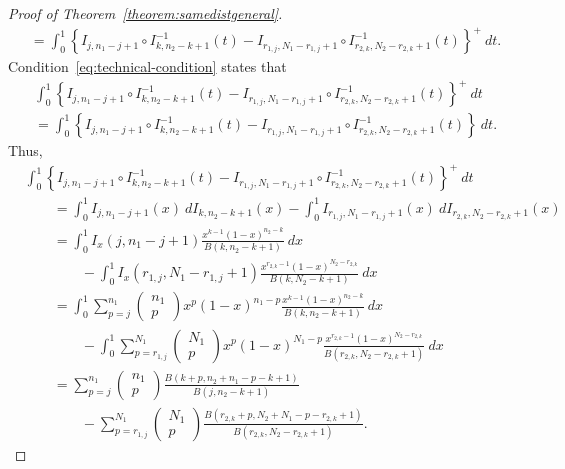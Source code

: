 \documentclass[12pt]{article}
\begin{document}
\begin{proof}[Proof of Theorem~\ref{theorem:samedistgeneral}]
\begin{align*}
	&= \int_0^1 \left\{I_{j, n_1-j+1} \circ I_{k, n_2-k+1}^{-1}(t) - I_{ r_{1,j}, N_1- r_{1,j}+1} \circ I_{ r_{2,k}, N_2- r_{2,k}+1}^{-1}(t)\right\}^+	 \ dt.
\end{align*}
Condition~\eqref{eq:technical-condition} states that 
\begin{align*}
	&\int_0^1 \left\{I_{j, n_1-j+1} \circ I_{k, n_2-k+1}^{-1}(t) - I_{ r_{1,j}, N_1- r_{1,j}+1} \circ I_{ r_{2,k}, N_2- r_{2,k}+1}^{-1}(t)\right\}^+\ dt \\
	&= \int_0^1 \left\{I_{j, n_1-j+1} \circ I_{k, n_2-k+1}^{-1}(t) - I_{ r_{1,j}, N_1- r_{1,j}+1} \circ I_{ r_{2,k}, N_2- r_{2,k}+1}^{-1}(t)\right\}\ dt.
\end{align*}
Thus,
\begin{align*}	
&\int_0^1 \left\{I_{j, n_1-j+1} \circ I_{k, n_2-k+1}^{-1}(t) - I_{ r_{1,j}, N_1- r_{1,j}+1} \circ I_{ r_{2,k}, N_2- r_{2,k}+1}^{-1}(t)\right\}^+\ dt \\
	&\qquad= \int_0^1 I_{j, n_1-j+1}(x) \ dI_{k, n_2-k+1}(x)- \int_0^1I_{ r_{1,j}, N_1- r_{1,j}+1}(x) \ dI_{ r_{2,k}, N_2- r_{2,k}+1}(x)\\
	&\qquad= \int_0^1 I_x(j, n_1 -j+1) \frac{x^{k-1}(1-x)^{n_2-k}}{B(k, n_2-k+1)} \ dx \\ 
	&\qquad\qquad- \int_0^1 I_x(r_{1,j}, N_1-r_{1,j}+1) \frac{x^{r_{2,k}-1}(1-x)^{N_2-r_{2,k}}}{B(k, N_2-k+1)} \ dx\\
	&\qquad =\int_0^1 \sum_{p=j}^{n_1}\left(\begin{array}{l}
n_1 \\
p
\end{array}\right) x^p(1-x)^{n_1-p} \frac{x^{k-1}(1-x)^{n_2-k}}{B(k, n_2-k+1)} \ dx \\
&\qquad\qquad - \int_0^1 \sum_{p=r_{1,j}}^{N_1}\left(\begin{array}{l}
N_1 \\
p
\end{array}\right) x^p(1-x)^{N_1-p} \frac{x^{r_{2,k}-1}(1-x)^{N_2-r_{2,k}}}{B(r_{2,k}, N_2-r_{2,k}+1)} \ dx\\ 
&\qquad = \sum_{p=j}^{n_1}\left(\begin{array}{l}
n_1 \\
p
\end{array}\right)\frac{B(k+p, n_2+n_1-p-k+1)}{B(j, n_2-k+1)} \\ 
&\qquad\qquad - \sum_{p=r_{1,j}}^{N_1}\left(\begin{array}{l}
N_1 \\
p
\end{array}\right)\frac{B(r_{2,k}+p, N_2+N_1-p-r_{2,k}+1)}{B(r_{2,k}, N_2-r_{2,k}+1)}.
\end{align*}
\end{proof}
\end{document}
